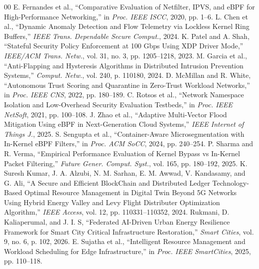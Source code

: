 \documentclass[conference]{IEEEtran}
\begin{document}
\begin{thebibliography}{00}
 E. Fernandes et al., ``Comparative Evaluation of Netfilter, IPVS, and eBPF for High-Performance Networking,'' in \emph{Proc. IEEE ISCC}, 2020, pp. 1--6.
 L. Chen et al., ``Dynamic Anomaly Detection and Flow Telemetry via Lockless Kernel Ring Buffers,'' \emph{IEEE Trans. Dependable Secure Comput.}, 2024.
 K. Patel and A. Shah, ``Stateful Security Policy Enforcement at 100 Gbps Using XDP Driver Mode,'' \emph{IEEE/ACM Trans. Netw.}, vol. 31, no. 3, pp. 1205--1218, 2023.
 M. Garcia et al., ``Anti-Flapping and Hysteresis Algorithms in Distributed Intrusion Prevention Systems,'' \emph{Comput. Netw.}, vol. 240, p. 110180, 2024.
 D. McMillan and R. White, ``Autonomous Trust Scoring and Quarantine in Zero-Trust Workload Networks,'' in \emph{Proc. IEEE CNS}, 2022, pp. 180--189.
 C. Rotsos et al., ``Network Namespace Isolation and Low-Overhead Security Evaluation Testbeds,'' in \emph{Proc. IEEE NetSoft}, 2021, pp. 100--108.
 J. Zhao et al., ``Adaptive Multi-Vector Flood Mitigation Using eBPF in Next-Generation Cloud Systems,'' \emph{IEEE Internet of Things J.}, 2025.
 S. Sengupta et al., ``Container-Aware Microsegmentation with In-Kernel eBPF Filters,'' in \emph{Proc. ACM SoCC}, 2024, pp. 240--254.
 P. Sharma and R. Verma, ``Empirical Performance Evaluation of Kernel Bypass vs In-Kernel Packet Filtering,'' \emph{Future Gener. Comput. Syst.}, vol. 165, pp. 180--192, 2025.
 K. Suresh Kumar, J. A. Alzubi, N. M. Sarhan, E. M. Awwad, V. Kandasamy, and G. Ali, ``A Secure and Efficient BlockChain and Distributed Ledger Technology-Based Optimal Resource Management in Digital Twin Beyond 5G Networks Using Hybrid Energy Valley and Levy Flight Distributer Optimization Algorithm,'' \emph{IEEE Access}, vol. 12, pp. 110331--110352, 2024.
 Rukmani, D. Kaliaperumal, and J. I. S, ``Federated AI-Driven Urban Energy Resilience Framework for Smart City Critical Infrastructure Restoration,'' \emph{Smart Cities}, vol. 9, no. 6, p. 102, 2026.
 E. Sujatha et al., ``Intelligent Resource Management and Workload Scheduling for Edge Infrastructure,'' in \emph{Proc. IEEE SmartCities}, 2025, pp. 110--118.
\end{thebibliography}
\end{document}
